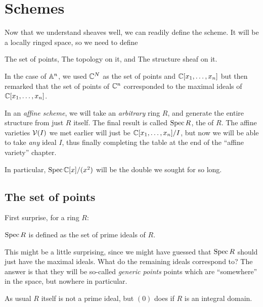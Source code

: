 \chapter{Schemes}
Now that we understand sheaves well, we can readily define the scheme.
It will be a locally ringed space, so we need to define
\begin{itemize}
	\ii The set of points,
	\ii The topology on it, and
	\ii The structure sheaf on it.
\end{itemize}

In the case of $\mathbb A^n$, we used $\mathbb C^N$ as the set of points
and $\mathbb C[x_1, \dots, x_n]$ but then remarked that the set of points
of $\mathbb C^n$ corresponded to the maximal ideals of $\mathbb C[x_1, \dots, x_n]$.

In an \emph{affine scheme}, we will take an \emph{arbitrary} ring $R$,
and generate the entire structure from just $R$ itself.
The final result is called $\operatorname{Spec} R$, the  of $R$.
The affine varieties $\mathcal V(I)$ we met earlier will just be
$\mathbb C[x_1, \dots, x_n] / I$, but now we will be able to take
\emph{any} ideal $I$, thus finally completing the table at the end
of the ``affine variety'' chapter.

In particular, $\operatorname{Spec} \mathbb C[x] / (x^2)$ will be the double we sought for so long.

\section{The set of points}

First surprise, for a ring $R$:
\begin{moral}
	$\operatorname{Spec} R$ is defined as the set of prime ideals of $R$.
\end{moral}

This might be a little surprising, since we might have guessed
that $\operatorname{Spec} R$ should just have the maximal ideals.
What do the remaining ideals correspond to?
The answer is that they will be so-called \emph{generic points}
points which are ``somewhere'' in the space, but nowhere in particular.

\begin{remark}
	As usual $R$ itself is not a prime ideal, but $(0)$
	does if $R$ is an integral domain.
\end{remark}

